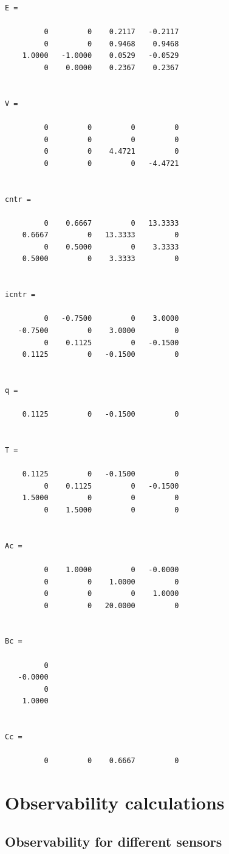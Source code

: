 \documentclass[12pt]{article}
\numberwithin{equation}{section}
\begin{document}
        \color{lightgray} \begin{verbatim}
E =

         0         0    0.2117   -0.2117
         0         0    0.9468    0.9468
    1.0000   -1.0000    0.0529   -0.0529
         0    0.0000    0.2367    0.2367


V =

         0         0         0         0
         0         0         0         0
         0         0    4.4721         0
         0         0         0   -4.4721


cntr =

         0    0.6667         0   13.3333
    0.6667         0   13.3333         0
         0    0.5000         0    3.3333
    0.5000         0    3.3333         0


icntr =

         0   -0.7500         0    3.0000
   -0.7500         0    3.0000         0
         0    0.1125         0   -0.1500
    0.1125         0   -0.1500         0


q =

    0.1125         0   -0.1500         0


T =

    0.1125         0   -0.1500         0
         0    0.1125         0   -0.1500
    1.5000         0         0         0
         0    1.5000         0         0


Ac =

         0    1.0000         0   -0.0000
         0         0    1.0000         0
         0         0         0    1.0000
         0         0   20.0000         0


Bc =

         0
   -0.0000
         0
    1.0000


Cc =

         0         0    0.6667         0

\end{verbatim} \color{black}

\section{Observability calculations}

\subsection{Observability for different sensors}
\end{document}
